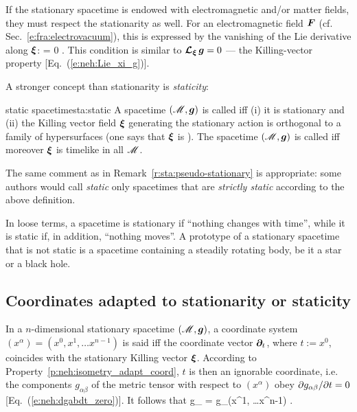 If the stationary spacetime is endowed with electromagnetic and/or
matter fields, they must respect the stationarity as well. For an electromagnetic
field $\bm{F}$ (cf. Sec.~\ref{e:fra:electrovacuum}), this is expressed by
the vanishing of the Lie derivative along $\bm{\xi}$:
\be
    \Lie{\xi}  = 0 .
\ee
This condition is similar to $\bm{\mathcal{L}}_{\bm{\xi}}\, \bm{g} = 0$ --- the Killing-vector property
[Eq.~(\ref{e:neh:Lie_xi_g})].

A stronger concept than stationarity is \emph{staticity}:

\begin{tdef}{static spacetime}{sta:static}
A spacetime $(\mathscr{M},\bm{g})$ is called 
iff (i) it is stationary and (ii) the Killing vector field $\bm{\xi}$
generating the stationary action is orthogonal to a family of hypersurfaces
(one says that $\bm{\xi}$ is ).
The spacetime $(\mathscr{M},\bm{g})$ is called 
iff moreover $\bm{\xi}$ is timelike in all $\mathscr{M}$.
\end{tdef}

\begin{remark}
The same comment as in Remark~\ref{r:sta:pseudo-stationary} is appropriate: some authors
would call \emph{static} only spacetimes that are
\emph{strictly static} according to the above definition.
\end{remark}

In loose terms, a spacetime is stationary if ``nothing changes with time'', while
it is static if, in addition, ``nothing moves''. A prototype of a stationary
spacetime that is not static is a spacetime containing a steadily rotating
body, be it a star or a black hole.


\subsection{Coordinates adapted to stationarity or staticity}

In a $n$-dimensional stationary spacetime $(\mathscr{M},\bm{g})$, a coordinate system $(x^\alpha) = (x^0, x^1, \ldots  x^{n-1})$
is said  iff the coordinate vector
$\bm{\partial}_t$, where $t := x^0$, coincides with the stationary Killing vector $\bm{\xi}$.
According to Property~\ref{p:neh:isometry_adapt_coord}, $t$ is then an
ignorable coordinate, i.e. the
components $g_{\alpha\beta}$ of the metric tensor with respect to $(x^\alpha)$ obey ${\partial g_{\alpha\beta}}/{\partial t} = 0$
[Eq.~(\ref{e:neh:dgabdt_zero})]. It follows that
\be
   g_{\alpha\beta}  = g_{\alpha\beta}(x^1, \ldots  x^{n-1}) .
\ee

